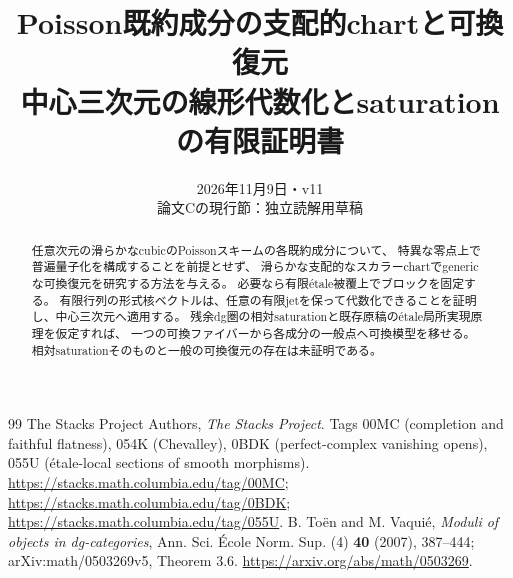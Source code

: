 \documentclass[a4paper,11pt]{ltjsarticle}
\title{Poisson既約成分の支配的chartと可換復元\\\large 中心三次元の線形代数化とsaturationの有限証明書}
\author{}\date{2026年11月9日・v11\\\small 論文Cの現行節：独立読解用草稿}
\theoremstyle{definition}\newtheorem{definition}[theorem]{定義}\newtheorem{example}[theorem]{例}
\theoremstyle{remark}\newtheorem{remark}[theorem]{注意}
\begin{document}
\maketitle
\begin{abstract}
任意次元の滑らかなcubicのPoissonスキームの各既約成分について、
特異な零点上で普遍量子化を構成することを前提とせず、
滑らかな支配的なスカラーchartでgenericな可換復元を研究する方法を与える。
必要なら有限étale被覆上でブロックを固定する。
有限行列の形式核ベクトルは、任意の有限jetを保って代数化できることを証明し、中心三次元へ適用する。
残余dg圏の相対saturationと既存原稿のétale局所実現原理を仮定すれば、
一つの可換ファイバーから各成分の一般点へ可換模型を移せる。
相対saturationそのものと一般の可換復元の存在は未証明である。
\end{abstract}
\tableofcontents

\begin{thebibliography}{99}
 The Stacks Project Authors, \emph{The Stacks Project}.
Tags 00MC (completion and faithful flatness), 054K (Chevalley),
0BDK (perfect-complex vanishing opens), 055U (étale-local sections of smooth morphisms).
\url{https://stacks.math.columbia.edu/tag/00MC};
\url{https://stacks.math.columbia.edu/tag/0BDK};
\url{https://stacks.math.columbia.edu/tag/055U}.
 B. Toën and M. Vaquié,
\emph{Moduli of objects in dg-categories},
Ann. Sci. École Norm. Sup. (4) \textbf{40} (2007), 387--444;
arXiv:math/0503269v5, Theorem 3.6.
\url{https://arxiv.org/abs/math/0503269}.
\end{thebibliography}
\end{document}
